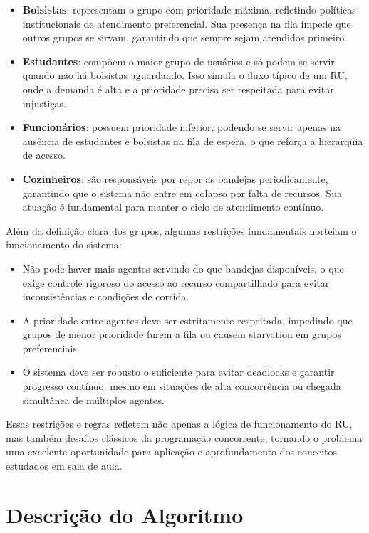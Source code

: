 \documentclass[10pt,a4paper]{article}
\begin{document}
\begin{itemize}
    \item \textbf{Bolsistas}: representam o grupo com prioridade máxima, refletindo políticas institucionais de atendimento preferencial. Sua presença na fila impede que outros grupos se sirvam, garantindo que sempre sejam atendidos primeiro.
    \item \textbf{Estudantes}: compõem o maior grupo de usuários e só podem se servir quando não há bolsistas aguardando. Isso simula o fluxo típico de um RU, onde a demanda é alta e a prioridade precisa ser respeitada para evitar injustiças.
    \item \textbf{Funcionários}: possuem prioridade inferior, podendo se servir apenas na ausência de estudantes e bolsistas na fila de espera, o que reforça a hierarquia de acesso.
    \item \textbf{Cozinheiros}: são responsáveis por repor as bandejas periodicamente, garantindo que o sistema não entre em colapso por falta de recursos. Sua atuação é fundamental para manter o ciclo de atendimento contínuo.
\end{itemize}

Além da definição clara dos grupos, algumas restrições fundamentais norteiam o funcionamento do sistema:
\begin{itemize}
    \item Não pode haver mais agentes servindo do que bandejas disponíveis, o que exige controle rigoroso do acesso ao recurso compartilhado para evitar inconsistências e condições de corrida.
    \item A prioridade entre agentes deve ser estritamente respeitada, impedindo que grupos de menor prioridade furem a fila ou causem starvation em grupos preferenciais.
    \item O sistema deve ser robusto o suficiente para evitar deadlocks e garantir progresso contínuo, mesmo em situações de alta concorrência ou chegada simultânea de múltiplos agentes.
\end{itemize}
Essas restrições e regras refletem não apenas a lógica de funcionamento do RU, mas também desafios clássicos da programação concorrente, tornando o problema uma excelente oportunidade para aplicação e aprofundamento dos conceitos estudados em sala de aula.

\section{Descrição do Algoritmo}
\end{document}
